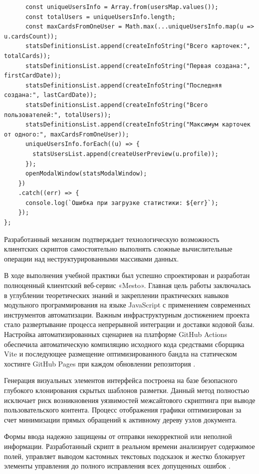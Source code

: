 \documentclass[bachelor, och, pract, times]{SCWorks}
\begin{document}
\begin{verbatim}
      const uniqueUsersInfo = Array.from(usersMap.values());
      const totalUsers = uniqueUsersInfo.length;
      const maxCardsFromOneUser = Math.max(...uniqueUsersInfo.map(u => u.cardsCount));
      statsDefinitionsList.append(createInfoString("Всего карточек:", totalCards));
      statsDefinitionsList.append(createInfoString("Первая создана:", firstCardDate));
      statsDefinitionsList.append(createInfoString("Последняя создана:", lastCardDate));
      statsDefinitionsList.append(createInfoString("Всего пользователей:", totalUsers));
      statsDefinitionsList.append(createInfoString("Максимум карточек от одного:", maxCardsFromOneUser));
      uniqueUsersInfo.forEach((u) => {
        statsUsersList.append(createUserPreview(u.profile));
      });
      openModalWindow(statsModalWindow);
    })
    .catch((err) => {
      console.log(`Ошибка при загрузке статистики: ${err}`);
    });
};
\end{verbatim}

Разработанный механизм подтверждает технологическую возможность клиентских
скриптов самостоятельно выполнять сложные вычислительные операции над
неструктурированными массивами данных.

\conclusion
В ходе выполнения учебной практики был успешно спроектирован и разработан
полноценный клиентский веб-сервис «Mesto». Главная цель работы заключалась в
углублении теоретических знаний и закреплении практических навыков модульного
программирования на языке JavaScript с применением современных инструментов
автоматизации. Важным инфраструктурным достижением проекта стало развертывание
процесса непрерывной интеграции и доставки кодовой базы. Настройка
автоматизированных сценариев на платформе GitHub Actions обеспечила
автоматическую компиляцию исходного кода средствами сборщика Vite и последующее
размещение оптимизированного бандла на статическом хостинге GitHub Pages при
каждом обновлении репозитория \cite{github_actions, vite_docs}.

Генерация визуальных элементов интерфейса построена на базе безопасного
глубокого клонирования скрытых шаблонов разметки. Данный метод полностью
исключает риск возникновения уязвимостей межсайтового скриптинга при выводе
пользовательского контента. Процесс отображения графики оптимизирован за счет
минимизации прямых обращений к активному дереву узлов документа.

Формы ввода надежно защищены от отправки некорректной или неполной
информации. Разработанный скрипт в реальном времени анализирует содержимое
полей, управляет выводом кастомных текстовых подсказок и жестко блокирует
элементы управления до полного исправления всех допущенных ошибок \cite{mdn_validity_state}.
\end{document}

